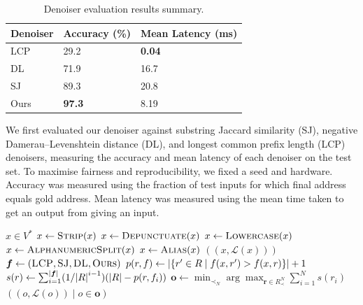 \documentclass{article}
\theoremstyle{definition}
\begin{document}
\begin{table}[H]
	\centering
	\begin{tabular}{lll}
		\toprule
		\textbf{Denoiser} & \textbf{Accuracy} (\%) & \textbf{Mean Latency} (ms) \\
		\midrule
		LCP & 29.2 & \textbf{0.04} \\
		DL & 71.9 & 16.7 \\
		SJ & 89.3 & 20.8 \\
		Ours & \textbf{97.3} & 8.19 \\
		\bottomrule
	\end{tabular}
	\caption{Denoiser evaluation results summary.}
\end{table}

We first evaluated our denoiser against
substring Jaccard similarity (SJ),
negative Damerau--Levenshtein distance (DL),
and
longest common prefix length (LCP)
denoisers,
measuring the accuracy and mean latency of each denoiser on the test set.
To maximise fairness and reproducibility, we fixed a seed and hardware.
Accuracy was measured using the fraction of test inputs for which final address equals gold address.
Mean latency was measured using the mean time taken to get an output from giving an input.

\begin{algorithm}[H]
	\caption{$\textsc{Predict}(x)$}
	\begin{algorithmic}
		\Require $x\in V^{*}$
		\State $x\gets\textsc{Strip}(x)$
		\State $x\gets\textsc{Depunctuate}(x)$
		\State $x\gets\textsc{Lowercase}(x)$
		\State $x\gets\textsc{AlphanumericSplit}(x)$
		\State $x\gets\textsc{Alias}(x)$
			\Return $((x,\mathscr{L}(x)))$
		\EndIf
		\State ${
			\bm{f}
			\gets
			(
				\textsc{LCP}, %
				\textsc{SJ},
				\textsc{DL},
				\textsc{Ours} %
			)
		}$
				\State ${
					p(r,f)
					\gets
					\abs{\{r'\in R\mid f(x,r')>f(x,r)\}}
					+
					1
				}$
			\EndFor
		\EndFor
			\State ${
				s(r)
				\gets
				\sum_{i=1}^{\abs{\bm{f}}}
				(1/\abs{R}^{i-1})
				(\abs{R}-p(r,f_{i}))
			}$
		\EndFor
		\State ${
			\bm{o}
			\gets
			\min_{\prec_{N}}
			\arg\max_{\bm{r}\in R_{\prec}^{N}}
			\sum_{i=1}^{N}
			s(r_{i})
		}$
		\State \Return $((o,\mathscr{L}(o))\mid o\in\bm{o})$
	\end{algorithmic}
\end{algorithm}
\end{document}
